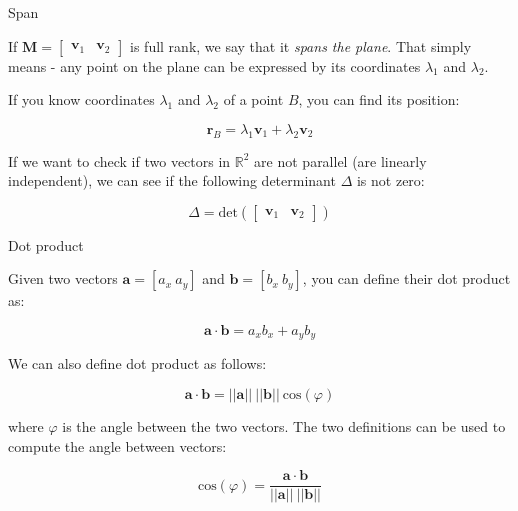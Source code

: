 \documentclass{beamer}
\begin{document}
\begin{frame}{Span}
	\begin{flushleft}
		
		If  $\mathbf M = \begin{bmatrix}
			\mathbf v_1 & \mathbf v_2
		\end{bmatrix}$ is full rank, we say that it \emph{spans the plane}. That simply means - any point on the plane can be expressed by its coordinates $\lambda_1$ and $\lambda_2$.
		
		\bigskip	
		
		If you know coordinates $\lambda_1$ and $\lambda_2$ of a point $B$, you can find its position:
		
	\begin{equation}
		\mathbf r_B
		=
	\lambda_1 \mathbf v_1 + \lambda_2 \mathbf v_2
\end{equation}	


If we want to check if two vectors in $\mathbb{R}^2$ are not parallel (are linearly independent), we can see if the following determinant $\Delta$ is not zero:

	\begin{equation}
		\Delta = 
		\text{det}\left(
		\begin{bmatrix}
			\mathbf v_1 & \mathbf v_2
		\end{bmatrix}\right)
\end{equation}	

		
	\end{flushleft}
\end{frame}





\begin{frame}{Dot product}
	\begin{flushleft}
		
		Given two vectors $\mathbf a = [a_x \ a_y]$ and $\mathbf b = [b_x \ b_y]$, you can define their dot product as:
		
			\begin{equation}
			\mathbf a \cdot \mathbf b = a_x b_x + a_y b_y
		\end{equation}	
	
	\bigskip
		
		We can also define dot product as follows: 
		
		\begin{equation}
			\mathbf a \cdot \mathbf b = 
			||\mathbf a|| \ ||\mathbf b|| \ \text{cos}(\varphi)
		\end{equation}	

	where $\varphi$ is the angle between the two vectors. The two definitions can be used to compute the angle between vectors:
	
		\begin{equation}
			\text{cos}(\varphi) = 
			\frac{\mathbf a \cdot \mathbf b}{||\mathbf a|| \ ||\mathbf b||}
		\end{equation}	
		
	\end{flushleft}
\end{frame}
\end{document}
